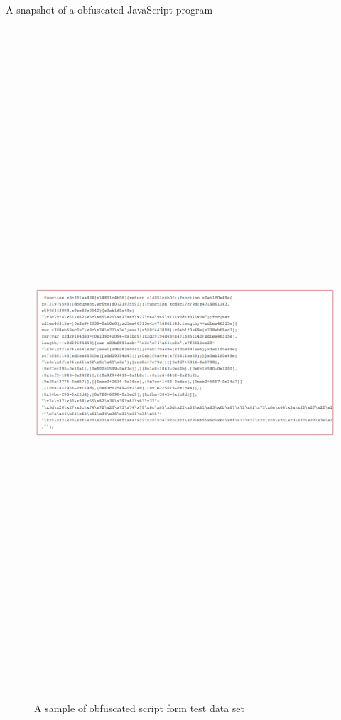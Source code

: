 \newpage

\bigskip

A snapshot of a obfuscated JavaScript program

\bigskip

\begin{figure}[htb]
\centering
\includegraphics[width=16cm,height=25cm,keepaspectratio]{image/obfuscated.png}
\caption[Obfuscated script sample]{A sample of obfuscated script form test data set} 
\label{fig:obfuscated}
\end{figure}

